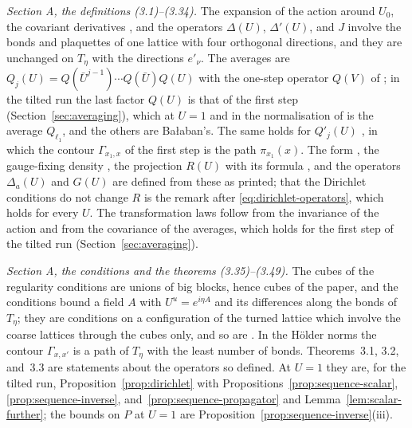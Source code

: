 \documentclass[11pt]{preprint}
\numberwithin{equation}{section}
\theoremstyle{definition}
\theoremstyle{remark}
\theoremstyle{plain}
\begin{document}
\emph{Section A, the definitions (3.1)--(3.34).} The expansion \cite[(3.1)--(3.12)]{BalabanPBG} of the action around $U_0$, the covariant derivatives \cite[(3.3), (3.4), (3.8), (3.9)]{BalabanPBG}, and the operators $\Delta(U)$, $\Delta'(U)$, and $J$ \cite[(3.10), (3.11)]{BalabanPBG} involve the bonds and plaquettes of one lattice with four orthogonal directions, and they are unchanged on $T_\eta$ with the directions $e'_\nu$. The averages \cite[(3.13)--(3.15)]{BalabanPBG} are $Q_j(U) = Q(\bar U^{j-1}) \cdots Q(\bar U)Q(U)$ with the one-step operator $Q(V)$ of \cite[(124)]{BalabanAVG}; in the tilted run the last factor $Q(U)$ is that of the first step (Section~\ref{sec:averaging}), which at $U = 1$ and in the normalisation of \cite[(3.14)]{BalabanPBG} is the average $Q_{\ell_1}$, and the others are Ba{\l}aban's. The same holds for $Q'_j(U)$ \cite[(3.19)]{BalabanPBG}, in which the contour $\Gamma_{x_1,x}$ of the first step is the path $\pi_{x_1}(x)$. The form \cite[(3.16)]{BalabanPBG}, the gauge-fixing density \cite[(3.17), (3.20)]{BalabanPBG}, the projection $R(U)$ with its formula \cite[(3.21)--(3.25)]{BalabanPBG}, and the operators $\Delta_a(U)$ and $G(U)$ \cite[(3.26), (3.27)]{BalabanPBG} are defined from these as printed; that the Dirichlet conditions do not change $R$ is the remark after \eqref{eq:dirichlet-operators}, which holds for every $U$. The transformation laws \cite[(3.28)--(3.34)]{BalabanPBG} follow from the invariance of the action and from the covariance of the averages, which holds for the first step of the tilted run (Section~\ref{sec:averaging}).

\emph{Section A, the conditions and the theorems (3.35)--(3.49).} The cubes of the regularity conditions \cite[(3.35), (3.36)]{BalabanPBG} are unions of big blocks, hence cubes of the paper, and the conditions bound a field $A$ with $U^u = e^{i\eta A}$ and its differences along the bonds of $T_\eta$; they are conditions on a configuration of the turned lattice which involve the coarse lattices through the cubes only, and so are \cite[(3.37), (3.38)]{BalabanPBG}. In the H\"older norms \cite[(3.40)]{BalabanPBG} the contour $\Gamma_{x,x'}$ is a path of $T_\eta$ with the least number of bonds. Theorems~3.1, 3.2, and~3.3 are statements about the operators so defined. At $U = 1$ they are, for the tilted run, Proposition~\ref{prop:dirichlet} with Propositions~\ref{prop:sequence-scalar}, \ref{prop:sequence-inverse}, and~\ref{prop:sequence-propagator} and Lemma~\ref{lem:scalar-further}; the bounds \cite[(3.49)]{BalabanPBG} on $P$ at $U = 1$ are Proposition~\ref{prop:sequence-inverse}(iii).
\end{document}
